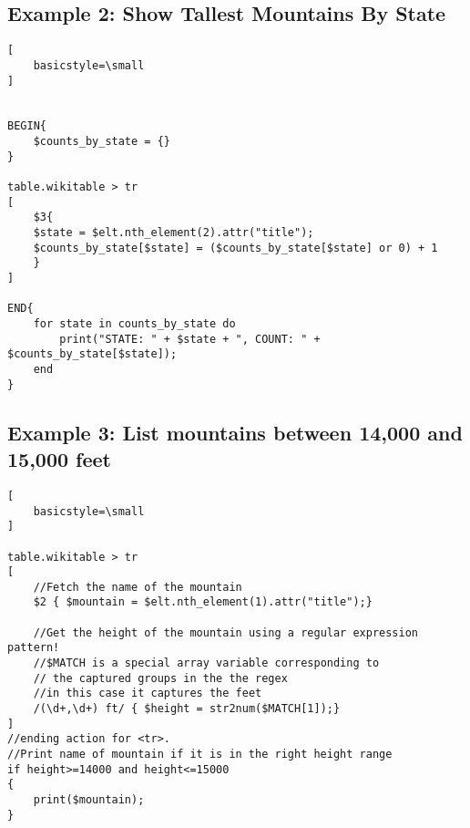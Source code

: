 \documentclass[12pt]{article}
\begin{document}
\subsection*{Example 2: Show Tallest Mountains By State}

\begin{lstlisting}[
    basicstyle=\small
]


BEGIN{
	$counts_by_state = {}
}

table.wikitable > tr 
[
	$3{
	$state = $elt.nth_element(2).attr("title");
	$counts_by_state[$state] = ($counts_by_state[$state] or 0) + 1
	}
]

END{
	for state in counts_by_state do
		print("STATE: " + $state + ", COUNT: " + $counts_by_state[$state]);
	end
}

\end{lstlisting}

\subsection*{Example 3: List mountains between 14,000 and 15,000 feet}

\begin{lstlisting}[
    basicstyle=\small
]

table.wikitable > tr 
[
	//Fetch the name of the mountain
	$2 { $mountain = $elt.nth_element(1).attr("title");}
	
	//Get the height of the mountain using a regular expression pattern!
	//$MATCH is a special array variable corresponding to 
	// the captured groups in the the regex
	//in this case it captures the feet
	/(\d+,\d+) ft/ { $height = str2num($MATCH[1]);}
]
//ending action for <tr>. 
//Print name of mountain if it is in the right height range
if height>=14000 and height<=15000
{
	print($mountain);
}

\end{lstlisting}
\end{document}
